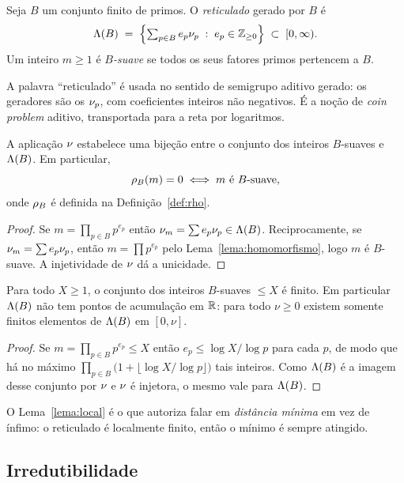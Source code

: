 \begin{definicao}\label{def:reticulado}
Seja $B$ um conjunto finito de primos. O \emph{reticulado} gerado por $B$ é
\[
  \Lambda(B) \;=\; \Bigl\{\textstyle\sum_{p\in B} e_p \nu_{p}
   \;:\; e_p\in\mathbb{Z}_{\ge 0}\Bigr\} \;\subset\; [0,\infty).
\]
Um inteiro $m\ge1$ é \emph{$B$-suave} se todos os seus fatores primos pertencem a
$B$.
\end{definicao}

A palavra ``reticulado'' é usada no sentido de semigrupo aditivo gerado: os
geradores são os $\nu_{p}$, com coeficientes inteiros não negativos. É a noção de
\emph{coin problem} aditivo, transportada para a reta por logaritmos.

\begin{lema}\label{lema:suaves}
A aplicação $\nu_{}$ estabelece uma bijeção entre o conjunto dos inteiros
$B$-suaves e $\Lambda(B)$. Em particular,
\[
  \rho_B(m)=0 \iff m \text{ é } B\text{-suave},
\]
onde $\rho_B$ é definida na Definição~\ref{def:rho}.
\end{lema}

\begin{proof}
Se $m=\prod_{p\in B}p^{e_p}$ então $\nu_{m}=\sum e_p\nu_{p}\in\Lambda(B)$.
Reciprocamente, se $\nu_{m}=\sum e_p\nu_{p}$, então
$m=\prod p^{e_p}$ pelo Lema~\ref{lema:homomorfismo}, logo $m$ é $B$-suave. A
injetividade de $\nu_{}$ dá a unicidade.
\end{proof}

\begin{lema}\label{lema:local}
Para todo $X\ge 1$, o conjunto dos inteiros $B$-suaves $\le X$ é finito. Em
particular $\Lambda(B)$ não tem pontos de acumulação em $\mathbb{R}$: para todo $\nu\ge0$
existem somente finitos elementos de $\Lambda(B)$ em $[0,\nu]$.
\end{lema}

\begin{proof}
Se $m=\prod_{p\in B}p^{e_p}\le X$ então $e_p\le \log X/\log p$ para cada $p$, de
modo que há no máximo $\prod_{p\in B}\bigl(1+\lfloor\log X/\log p\rfloor\bigr)$
tais inteiros. Como $\Lambda(B)$ é a imagem desse conjunto por $\nu_{}$ e
$\nu_{}$ é injetora, o mesmo vale para $\Lambda(B)$.
\end{proof}

O Lema~\ref{lema:local} é o que autoriza falar em \emph{distância mínima} em vez
de ínfimo: o reticulado é localmente finito, então o mínimo é sempre atingido.

\subsection{Irredutibilidade}

